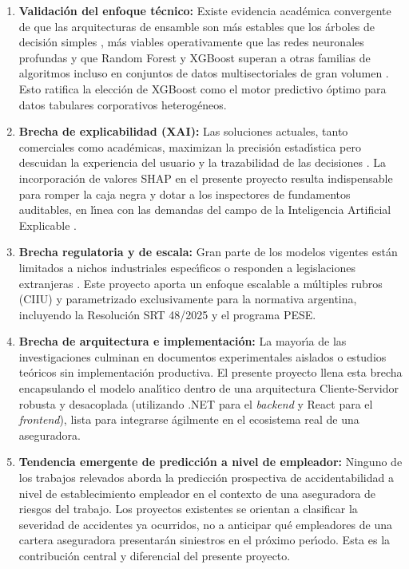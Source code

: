 \begin{enumerate}
	\item \textbf{Validaci\'on del enfoque t\'ecnico:}
	Existe evidencia acad\'emica convergente de que las arquitecturas de ensamble son m\'as estables que los \'arboles de decisi\'on simples \parencite{subauste2023}, m\'as viables operativamente que las redes neuronales profundas \parencite{yapi2025} y que Random Forest y XGBoost superan a otras familias de algoritmos incluso en conjuntos de datos multisectoriales de gran volumen \parencite{sarkar2022,zermane2022}. Esto ratifica la elecci\'on de XGBoost como el motor predictivo \'optimo para datos tabulares corporativos heterog\'eneos.

	\item \textbf{Brecha de explicabilidad (XAI):}
	Las soluciones actuales, tanto comerciales como acad\'emicas, maximizan la precisi\'on estad\'{\i}stica pero descuidan la experiencia del usuario y la trazabilidad de las decisiones \parencite{zamora2024}. La incorporaci\'on de valores SHAP en el presente proyecto resulta indispensable para romper la caja negra y dotar a los inspectores de fundamentos auditables, en l\'{\i}nea con las demandas del campo de la Inteligencia Artificial Explicable \parencite{arrieta2020}.

	\item \textbf{Brecha regulatoria y de escala:}
	Gran parte de los modelos vigentes est\'an limitados a nichos industriales espec\'{\i}ficos \parencite{mosquera2021,zermane2022} o responden a legislaciones extranjeras \parencite{yapi2025,sarkar2022}. Este proyecto aporta un enfoque escalable a m\'ultiples rubros (CIIU) y parametrizado exclusivamente para la normativa argentina, incluyendo la Resoluci\'on SRT 48/2025 y el programa PESE.

	\item \textbf{Brecha de arquitectura e implementaci\'on:}
	La mayor\'{\i}a de las investigaciones culminan en documentos experimentales aislados o estudios te\'oricos sin implementaci\'on productiva. El presente proyecto llena esta brecha encapsulando el modelo anal\'{\i}tico dentro de una arquitectura Cliente-Servidor robusta y desacoplada (utilizando .NET para el \emph{backend} y React para el \emph{frontend}), lista para integrarse \'agilmente en el ecosistema real de una aseguradora.

	\item \textbf{Tendencia emergente de predicci\'on a nivel de empleador:}
	Ninguno de los trabajos relevados aborda la predicci\'on prospectiva de accidentabilidad a nivel de establecimiento empleador en el contexto de una aseguradora de riesgos del trabajo. Los proyectos existentes se orientan a clasificar la severidad de accidentes ya ocurridos, no a anticipar qu\'e empleadores de una cartera aseguradora presentar\'an siniestros en el pr\'oximo per\'{\i}odo. Esta es la contribuci\'on central y diferencial del presente proyecto.
\end{enumerate}
